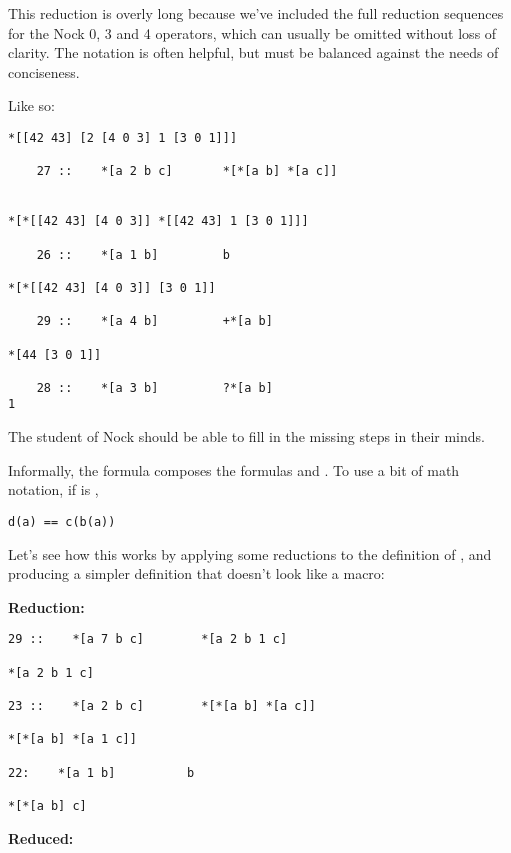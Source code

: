 This reduction is overly long because we've included the full reduction sequences for the Nock 0, 3 and 4 operators, which can usually be omitted without loss of clarity. The notation is often helpful, but must be balanced against the needs of conciseness.

Like so:

\begin{framed_shaded}
\begin{Verbatim}[fontsize=\relsize{-2.5},commandchars=\\\{\}]
*[[42 43] [2 [4 0 3] 1 [3 0 1]]]

    27 ::    *[a 2 b c]       *[*[a b] *[a c]]


*[*[[42 43] [4 0 3]] *[[42 43] 1 [3 0 1]]]

    26 ::    *[a 1 b]         b

*[*[[42 43] [4 0 3]] [3 0 1]]

    29 ::    *[a 4 b]         +*[a b]

*[44 [3 0 1]]

    28 ::    *[a 3 b]         ?*[a b]
1
\end{Verbatim}
\end{framed_shaded}
The student of Nock should be able to fill in the missing steps in their minds.

Informally, the formula \kode{[7 b c]} composes the formulas  and
.  To use a bit of math notation, if  is \kode{[7 b c]},

\begin{framed_shaded}
\begin{Verbatim}[fontsize=\relsize{-2.5},commandchars=\\\{\}]
d(a) == c(b(a))
\end{Verbatim}
\end{framed_shaded}
Let's see how this works by applying some reductions to the
definition of , and producing a simpler definition that
doesn't look like a macro:

\textbf{ Reduction:}

\begin{framed_shaded}
\begin{Verbatim}[fontsize=\relsize{-2.5},commandchars=\\\{\}]
29 ::    *[a 7 b c]        *[a 2 b 1 c]

*[a 2 b 1 c]

23 ::    *[a 2 b c]        *[*[a b] *[a c]]

*[*[a b] *[a 1 c]]

22:    *[a 1 b]          b

*[*[a b] c]
\end{Verbatim}
\end{framed_shaded}
\textbf{ Reduced:}

